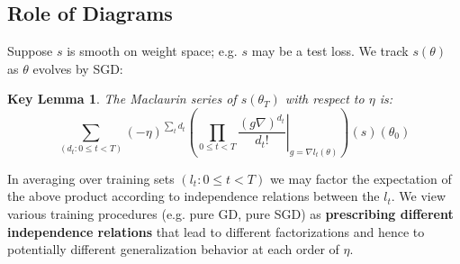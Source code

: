 \documentclass{article}
\newtheorem{klem}{Key Lemma}
\begin{document}
\subsection{Role of Diagrams}
    Suppose $s$ is smooth on weight space; e.g. $s$ may be a test
    loss.  We track $s(\theta)$ as $\theta$ evolves by SGD:
    \begin{klem}
        The Maclaurin series of $s(\theta_T)$ with respect to $\eta$ is:
        \begin{equation}\label{eq:dyson}
            \sum_{(d_t: 0\leq t<T)}
            (-\eta)^{\sum_t d_t}
            \left(
                \prod_{0 \leq t < T}
                    \left.  \frac{(g \nabla)^{d_t}}{d_t!} \right|_{g=\nabla l_t(\theta)}
            \right)
            (s) (\theta_0)
        \end{equation}
    \end{klem}
    In averaging over training sets $(l_t: 0\leq t<T)$ we may factor the
    expectation of the above product according to independence relations
    between the $l_t$.  We view various training procedures (e.g. pure GD, pure
    SGD) as {\bf prescribing different independence relations} that lead to
    different factorizations and hence to potentially different generalization
    behavior at each order of $\eta$.
\end{document}
